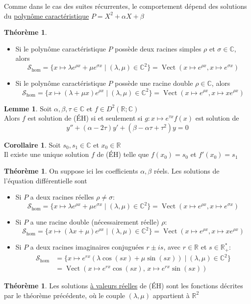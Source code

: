 \documentclass[10pt,a4paper]{article}
\theoremstyle{definition}
\newtheorem{theorem}[proposition]{Théorème}
\newtheorem{corollaire}[proposition]{Corollaire}
\newtheorem{lemme}[proposition]{Lemme}
\DeclareMathOperator{\vect}{Vect}
\begin{document}
\noindent Comme dans le cas des suites récurrentes, le comportement dépend des solutions du \uline{polynôme caractéristique} $P = X^2 + \alpha X + \beta$
\begin{theorem}
\hfill
\begin{itemize}
\item Si le polynôme caractéristique $P$ possède deux racines simples $\rho$ et $\sigma \in \mathbb{C}$, alors
\[ \mathcal{S}_\text{hom} = \{ x \mapsto \lambda e^{\rho x} + \mu e^{\sigma x} \mid (\lambda, \mu) \in \mathbb{C}^2 \} = \vect( x \mapsto e^{\rho x}, x \mapsto e^{\sigma x}) \]
\item Si le polynôme caractéristique $P$ possède une racine double $\rho \in \mathbb{C}$, alors
\[ \mathcal{S}_\text{hom} = \{ x \mapsto (\lambda + \mu x) e^{\rho x} \mid (\lambda, \mu) \in \mathbb{C}^2 \} = \vect( x \mapsto e^{\rho x}, x \mapsto x e^{\rho x}) \]
\end{itemize}
\end{theorem}
\begin{lemme}
Soit $\alpha, \beta, \tau \in \mathbb{C}$ et $f \in D^2(\mathbb{R}; \mathbb{C})$ \\
Alors $f$ est solution de (ÉH) si et seulement si $g: x \mapsto e^{\tau x}f(x)$ est solution de
\[ y'' + (\alpha - 2\tau)y' + (\beta - \alpha \tau + \tau^2)y = 0 \tag{ÉH$_\tau$} \]
\end{lemme}
\begin{corollaire}
Soit $s_0, s_1 \in \mathbb{C}$ et $x_0 \in \mathbb{R}$ \\
Il existe une unique solution $f$ de (ÉH) telle que $f(x_0) = s_0$ et $f'(x_0) = s_1$
\end{corollaire}
\begin{theorem}
On suppose ici les coefficients $\alpha, \beta$ réels. Les solutions de l'équation différentielle sont
\begin{itemize}
\item Si $P$ a deux racines réelles $\rho \neq \sigma$:
\[ \mathcal{S}_\text{hom} = \{ x \mapsto \lambda e^{\rho x} + \mu e^{\sigma x} \mid (\lambda, \mu) \in \mathbb{C}^2 \} = \vect(x \mapsto e^{\rho x}, x \mapsto e^{\sigma x}) \]
\item Si $P$ a une racine double (nécessairement réelle) $\rho$:
\[ \mathcal{S}_\text{hom} = \{ x \mapsto (\lambda x + \mu) e^{\rho x} \mid (\lambda, \mu) \in \mathbb{C}^2 \} = \vect(x \mapsto e^{\rho x}, x \mapsto x e^{\rho x}) \]
\item Si $P$ a deux racines imaginaires conjuguées $r \pm is$, avec $r \in \mathbb{R}$ et $s \in \mathbb{R}_+^*$:
\begin{align*}
\mathcal{S}_\text{hom} &= \{ x \mapsto e^{r x}(\lambda \cos(sx) + \mu \sin(sx)) \mid (\lambda, \mu) \in \mathbb{C}^2 \} \\
&= \vect( x \mapsto e^{r x} \cos(sx),\, x \mapsto e^{r x} \sin(sx))
\end{align*}
\end{itemize}
\end{theorem}
\begin{theorem}
Les solutions \uline{à valeurs réelles} de (ÉH) sont les fonctions décrites par le théorème précédente, où le couple $(\lambda, \mu)$ appartient à $\mathbb{R}^2$
\end{theorem}
\end{document}
